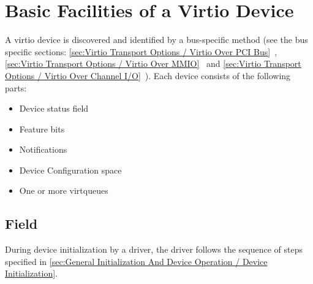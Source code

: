 \chapter{Basic Facilities of a Virtio Device}\label{sec:Basic Facilities of a Virtio Device}

A virtio device is discovered and identified by a bus-specific method
(see the bus specific sections: \ref{sec:Virtio Transport Options / Virtio Over PCI Bus}~,
\ref{sec:Virtio Transport Options / Virtio Over MMIO}~ and \ref{sec:Virtio Transport Options / Virtio Over Channel I/O}~).  Each
device consists of the following parts:

\begin{itemize}
\item Device status field
\item Feature bits
\item Notifications
\item Device Configuration space
\item One or more virtqueues
\end{itemize}

\section{ Field}\label{sec:Basic Facilities of a Virtio Device / Device Status Field}
During device initialization by a driver,
the driver follows the sequence of steps specified in
\ref{sec:General Initialization And Device Operation / Device
Initialization}.

